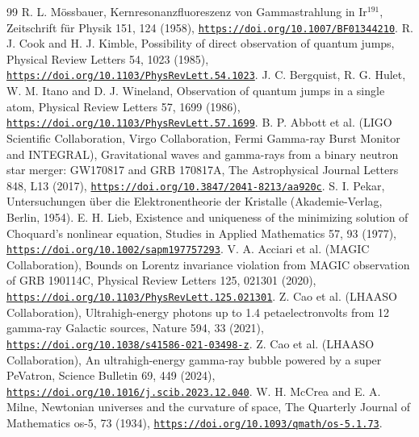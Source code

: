 \documentclass[pdflatex,sn-mathphys-num]{sn-jnl}
\theoremstyle{thmstyleone}
\begin{document}
\begin{thebibliography}{99}
 R. L. M\"ossbauer, Kernresonanzfluoreszenz von Gammastrahlung in Ir$^{191}$, Zeitschrift f\"ur Physik 151, 124 (1958), \href{https://doi.org/10.1007/BF01344210}{\nolinkurl{https://doi.org/10.1007/BF01344210}}.
 R. J. Cook and H. J. Kimble, Possibility of direct observation of quantum jumps, Physical Review Letters 54, 1023 (1985), \href{https://doi.org/10.1103/PhysRevLett.54.1023}{\nolinkurl{https://doi.org/10.1103/PhysRevLett.54.1023}}.
 J. C. Bergquist, R. G. Hulet, W. M. Itano and D. J. Wineland, Observation of quantum jumps in a single atom, Physical Review Letters 57, 1699 (1986), \href{https://doi.org/10.1103/PhysRevLett.57.1699}{\nolinkurl{https://doi.org/10.1103/PhysRevLett.57.1699}}.
 B. P. Abbott et al. (LIGO Scientific Collaboration, Virgo Collaboration, Fermi Gamma-ray Burst Monitor and INTEGRAL), Gravitational waves and gamma-rays from a binary neutron star merger: GW170817 and GRB 170817A, The Astrophysical Journal Letters 848, L13 (2017), \href{https://doi.org/10.3847/2041-8213/aa920c}{\nolinkurl{https://doi.org/10.3847/2041-8213/aa920c}}.
 S. I. Pekar, Untersuchungen \"uber die Elektronentheorie der Kristalle (Akademie-Verlag, Berlin, 1954).
 E. H. Lieb, Existence and uniqueness of the minimizing solution of Choquard's nonlinear equation, Studies in Applied Mathematics 57, 93 (1977), \href{https://doi.org/10.1002/sapm197757293}{\nolinkurl{https://doi.org/10.1002/sapm197757293}}.
 V. A. Acciari et al. (MAGIC Collaboration), Bounds on Lorentz invariance violation from MAGIC observation of GRB 190114C, Physical Review Letters 125, 021301 (2020), \href{https://doi.org/10.1103/PhysRevLett.125.021301}{\nolinkurl{https://doi.org/10.1103/PhysRevLett.125.021301}}.
 Z. Cao et al. (LHAASO Collaboration), Ultrahigh-energy photons up to 1.4 petaelectronvolts from 12 gamma-ray Galactic sources, Nature 594, 33 (2021), \href{https://doi.org/10.1038/s41586-021-03498-z}{\nolinkurl{https://doi.org/10.1038/s41586-021-03498-z}}.
 Z. Cao et al. (LHAASO Collaboration), An ultrahigh-energy gamma-ray bubble powered by a super PeVatron, Science Bulletin 69, 449 (2024), \href{https://doi.org/10.1016/j.scib.2023.12.040}{\nolinkurl{https://doi.org/10.1016/j.scib.2023.12.040}}.
 W. H. McCrea and E. A. Milne, Newtonian universes and the curvature of space, The Quarterly Journal of Mathematics os-5, 73 (1934), \href{https://doi.org/10.1093/qmath/os-5.1.73}{\nolinkurl{https://doi.org/10.1093/qmath/os-5.1.73}}.

\end{thebibliography}
\end{document}
